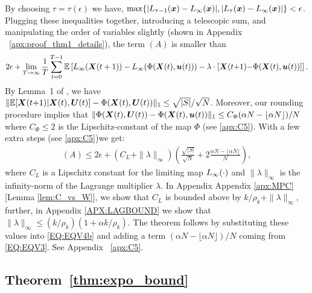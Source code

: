By choosing $\tau = \tau(\epsilon)$ we have, $\max \{|L_{\tau - 1}({\bm{x}}) - L_{\infty}({\bm{x}})|, |L_{\tau}({\bm{x}}) - L_{\infty}({\bm{x}})|\} < \epsilon$.
Plugging these inequalities together, introducing a telescopic sum, and manipulating the order of variables slightly (shown in Appendix %
~\ref{apx:proof_thm1_details}), the term $(A)$ is smaller than
\begin{align}
    \label{EQ:EQV4}
    2\epsilon + \lim_{T\to\infty}  \frac{1}{T}\sum_{t = 0}^{T - 1} \E \left[\Costmin{\infty}{\mX(t + 1)} - \Costmin{\infty}{\Phi(\mX(t), \bu(t))} - \lambda\cdot [\mX(t {+} 1) {-} \Phi(\mX(t), \bu(t))] \right].%
\end{align}
By Lemma~1 of \cite{GGY23b}, we have $\|\mathbb{E} [{\bm{X}}(t {+} 1)| {\bm{X}}(t), \bm{U}(t)] - \Phi({\bm{X}}(t), \bm{U}(t))\|_1 \le \sqrt{|S|}/\sqrt{N}$. Moreover, our rounding procedure implies that $\|\Phi({\bm{X}}(t), \bm{U}(t))-\Phi({\bm{X}}(t), \bm{u}(t))\|_1\le C_\Phi(\alpha N - \lfloor\alpha N\rfloor)/N$ where $C_\Phi\le2$ is the Lipschitz-constant of the map $\Phi$ %
(see \ref{apx:C5}). With a few extra steps (see \ref{apx:C5})we get:%
\begin{align}
    \label{EQ:EQV4b}
    (A) \le 2\epsilon + (C_{L} + \|\lambda\|_\infty) \left(\frac{\sqrt{|S|}}{\sqrt{N}} + 2\frac{\alpha N - \lfloor\alpha N\rfloor}{N} \right),
\end{align}
where $C_{L}$ is a Lipschitz constant for the limiting map $L_{\infty}(\cdot)$ and $\|\lambda\|_\infty$ is the infinity-norm of the Lagrange multiplier $\lambda$. In Appendix 
Appendix \ref{apx:MPC}[Lemma \ref{lem:C_vs_W}],
we show that $C_{L}$ is bounded above by $k/\rho_k + \|\lambda\|_\infty$, further, in %
Appendix \ref{APX:LAGBOUND}
we show that $\|\lambda\|_\infty\le (k/\rho_k)(1+\alpha k/\rho_k)$.  The theorem follows by substituting these values into \eqref{EQ:EQV4b} and adding a term $(\alpha N - \lfloor{\alpha N}\rfloor)/N$ coming from \eqref{EQ:EQV3}. See Appendix %
~\ref{apx:C5}.



\subsection{Theorem~\ref{thm:expo_bound}}

